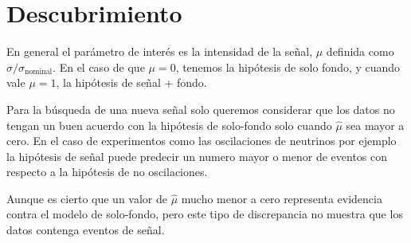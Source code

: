






\section{Descubrimiento}

En general el parámetro de interés es la intensidad de la señal, $\mu$ definida como
$\sigma/\sigma_\text{nominal}$. En el caso de que $\mu = 0$,
tenemos la hipótesis de solo fondo, y cuando vale $\mu = 1$, la hipótesis de señal + fondo.



Para la búsqueda de una nueva señal solo queremos considerar que los datos
no tengan un buen acuerdo con la hipótesis de solo-fondo solo cuando $\hat{\mu}$
sea mayor a cero. En el caso de experimentos como las oscilaciones de neutrinos
por ejemplo la hipótesis de señal puede predecir un numero mayor o menor de eventos
con respecto a la hipótesis de no oscilaciones.

Aunque es cierto que un valor de $\hat{\mu}$ mucho menor a cero representa evidencia
contra el modelo de solo-fondo, pero este tipo de discrepancia no muestra que los datos
contenga eventos de señal.

